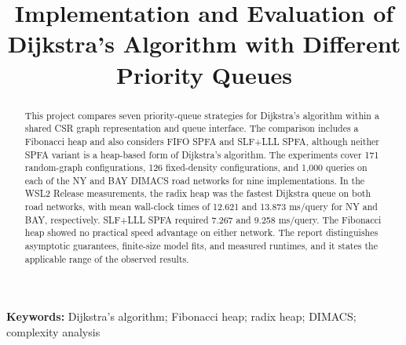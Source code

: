 \title{Implementation and Evaluation of Dijkstra's Algorithm with Different Priority Queues}
\author{}
\date{\ReportDate}
\maketitle
\begin{abstract}
This project compares seven priority-queue strategies for Dijkstra's algorithm
within a shared CSR graph representation and queue interface. The comparison
includes a Fibonacci heap and also considers FIFO SPFA and SLF+LLL SPFA, although
neither SPFA variant is a heap-based form of Dijkstra's algorithm. The experiments
cover 171 random-graph configurations, 126 fixed-density configurations, and
1,000 queries on each of the NY and BAY DIMACS road networks for nine
implementations. In the WSL2 Release measurements, the radix heap was the fastest
Dijkstra queue on both road networks, with mean wall-clock times of 12.621 and
13.873 ms/query for NY and BAY, respectively. SLF+LLL SPFA required 7.267 and
9.258 ms/query. The Fibonacci heap showed no practical speed advantage on either
network. The report distinguishes asymptotic guarantees, finite-size model fits,
and measured runtimes, and it states the applicable range of the observed results.
\end{abstract}
\noindent\textbf{Keywords:} Dijkstra's algorithm; Fibonacci heap; radix heap; DIMACS; complexity analysis

\clearpage
